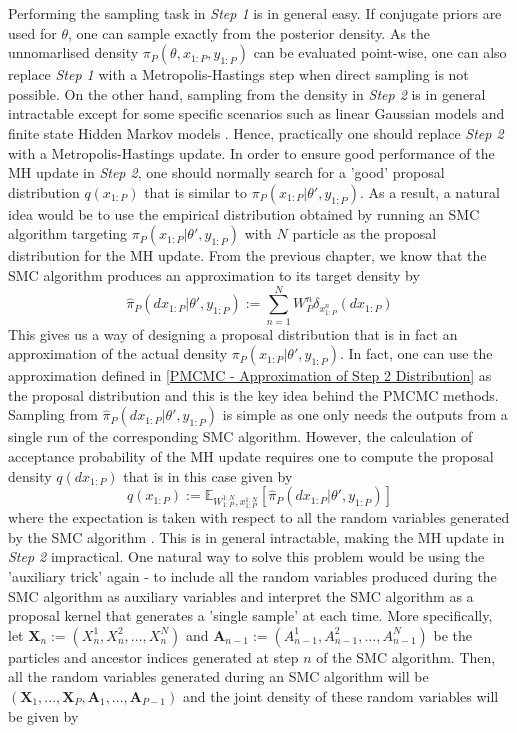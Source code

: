 \documentclass[12pt,a4paper]{article}
\begin{document}
Performing the sampling task in \textit{Step 1} is in general easy. If conjugate priors are used for $\theta$, one can sample exactly from the posterior density. As the unnomarlised density $\pi_P(\theta,x_{1:P},y_{1:P})$ can be evaluated point-wise, one can also replace \textit{Step 1} with a Metropolis-Hastings step when direct sampling is not possible. On the other hand, sampling from the density in \textit{Step 2} is in general intractable except for some specific scenarios such as linear Gaussian models and finite state Hidden Markov models \citep{andrieu2010particle}. Hence, practically one should replace \textit{Step 2} with a Metropolis-Hastings update. In order to ensure good performance of the MH update in \textit{Step 2}, one should normally search for a 'good' proposal distribution $q(x_{1:P})$ that is similar to $\pi_P(x_{1:P}|\theta',y_{1:P})$. As a result, a natural idea would be to use the empirical distribution obtained by running an SMC algorithm targeting $\pi_P(x_{1:P}|\theta',y_{1:P})$ with $N$ particle as the proposal distribution for the MH update. From the previous chapter, we know that the SMC algorithm produces an approximation to its target density by
\begin{equation}
    \label{PMCMC - Approximation of Step 2 Distribution}
    \hat{\pi}_P(dx_{1:P}|\theta',y_{1:P}):=\sum_{n=1}^{N} W_P^n \delta_{x_{1:P}^n}(dx_{1:P})
\end{equation}
This gives us a way of designing a proposal distribution that is in fact an approximation of the actual density $\pi_P(x_{1:P}|\theta',y_{1:P})$. In fact, one can use the approximation defined in \eqref{PMCMC - Approximation of Step 2 Distribution} as the proposal distribution and this is the key idea behind the PMCMC methods. Sampling from $\hat{\pi}_P(dx_{1:P}|\theta',y_{1:P})$ is simple as one only needs the outputs from a single run of the corresponding SMC algorithm. However, the calculation of acceptance probability of the MH update requires one to compute the proposal density $q(dx_{1:P})$ that is in this case given by 
\begin{equation}
    q(x_{1:P}) := \mathbb{E}_{W_{1:P}^{1:N},x_{1:P}^{1:N}}\left[\hat{\pi}_P(dx_{1:P}|\theta',y_{1:P})\right]
\end{equation}
where the expectation is taken with respect to all the random variables generated by the SMC algorithm \citep{andrieu2010particle}. This is in general intractable, making the MH update in \textit{Step 2} impractical. One natural way to solve this problem would be using the 'auxiliary trick' again - to include all the random variables produced during the SMC algorithm as auxiliary variables and interpret the SMC algorithm as a proposal kernel that generates a 'single sample' at each time. More specifically, let $\mathbf{X}_n := \left(X_n^1,X_n^2,...,X_n^N\right)$ and $\mathbf{A}_{n-1}:=\left(A_{n-1}^1,A_{n-1}^2,...,A_{n-1}^N\right)$ be the particles and ancestor indices generated at step $n$ of the SMC algorithm. Then, all the random variables generated during an SMC algorithm will be $\left(\mathbf{X}_1,...,\mathbf{X}_P,\mathbf{A}_1,...,\mathbf{A}_{P-1}\right)$ and the joint density of these random variables will be given by 
\end{document}

